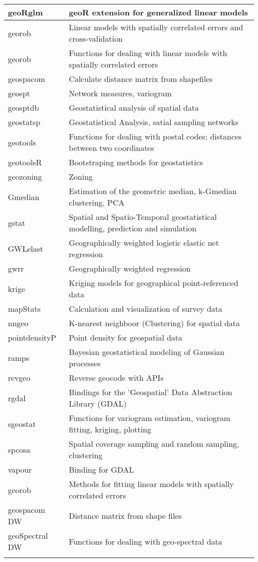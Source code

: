 \documentclass[article]{jss}
\begin{document}
\begin{table}[h]
\begin{tabular}{|l|l|}
geoRglm & geoR extension for generalized linear models  \\ \hline
georob & Linear models with spatially correlated errors and cross-validation  \\ \hline
georob & Functions for dealing with linear models with spatially correlated errors  \\ \hline
geospacom & Calculate distance matrix from shapefiles \\ \hline
geospt & Network measures, variogram  \\ \hline
geosptdb & Geostatistical analysis of spatial data \\ \hline
geostatsp & Geostatistical Analysis, satial sampling networks \\ \hline
geotools & Functions for dealing with postal codes; distances between two coordinates \\ \hline
geotoolsR & Bootstraping methods for geostatistics \\ \hline
geozoning & Zoning \\ \hline
Gmedian & Estimation of the geometric median, k-Gmedian clustering, PCA \\ \hline
gstat & Spatial and Spatio-Temporal geostatistical modelling, prediction and simulation \\ \hline
GWLelast & Geographically weighted logistic elastic net regression \\ \hline
gwrr & Geographically weighted regression \\ \hline
krige & Kriging models for geographical point-referenced data \\ \hline
mapStats & Calculation and visualization of survey data \\ \hline
nngeo & K-nearest neighboor (Clustering) for spatial data \\ \hline
pointdensityP & Point density for geospatial data \\ \hline
ramps & Bayesian geostatistical modeling of Gaussian processes \\ \hline
revgeo & Reverse geocode with APIs \\ \hline
rgdal & Bindings for the 'Geospatial' Data Abstraction Library (GDAL) \\ \hline
sgeostat & Functions for variogram estimation, variogram fitting, kriging, plotting \\ \hline
spcosa & Spatial coverage sampling and random sampling, clustering \\ \hline
vapour & Binding for GDAL \\ \hline
georob & Methods for fitting linear models with spatially correlated errors \\ \hline
geospacom DW & Distance matrix from shape files \\ \hline
geoSpectral DW & Functions for dealing with geo-spectral data \\ \hline
\label{table1}
\end{tabular}
\end{table}
\end{document}
